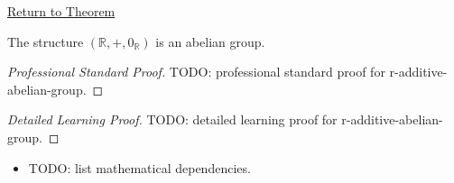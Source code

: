 \newpage
{}
\label{prf:r-additive-abelian-group}

\begin{remark*}[Return]
\hyperref[thm:r-additive-abelian-group]{Return to Theorem}
\end{remark*}

\begin{theorem*}
The structure $(\mathbb{R},+,0_{\mathbb{R}})$ is an abelian group.
\end{theorem*}

\begin{proof}[Professional Standard Proof]
\LRAProofBodyStart
TODO: professional standard proof for r-additive-abelian-group.
\end{proof}

\begin{proof}[Detailed Learning Proof]
\LRAProofBodyStart
TODO: detailed learning proof for r-additive-abelian-group.
\end{proof}

\begin{remark*}
\end{remark*}

\begin{dependencies}
\begin{itemize}
  \item TODO: list mathematical dependencies.
\end{itemize}
\end{dependencies}

\clearpage
